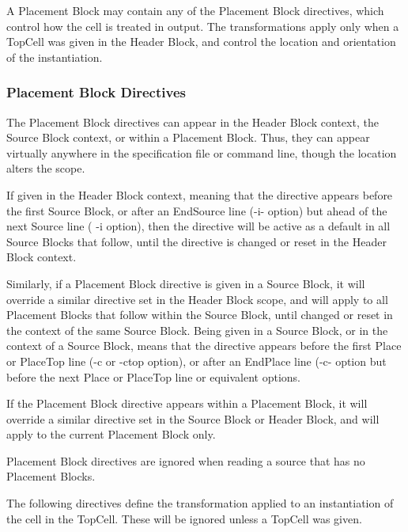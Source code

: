 A Placement Block may contain any of the Placement Block directives,
which control how the cell is treated in output.  The transformations
apply only when a {\vt TopCell} was given in the Header Block, and
control the location and orientation of the instantiation.

\subsubsection{Placement Block Directives}

The Placement Block directives can appear in the Header Block context,
the Source Block context, or within a Placement Block.  Thus, they can
appear virtually anywhere in the specification file or command line,
though the location alters the scope.

If given in the Header Block context, meaning that the directive
appears before the first Source Block, or after an {\vt EndSource}
line ({\vt -i-} option) but ahead of the next {\vt Source} line ({\vt
-i} option), then the directive will be active as a default in all
Source Blocks that follow, until the directive is changed or reset in
the Header Block context.

Similarly, if a Placement Block directive is given in a Source Block,
it will override a similar directive set in the Header Block scope,
and will apply to all Placement Blocks that follow within the Source
Block, until changed or reset in the context of the same Source Block. 
Being given in a Source Block, or in the context of a Source Block,
means that the directive appears before the first {\vt Place} or {\vt
PlaceTop} line ({\vt -c} or {\vt -ctop} option), or after an {\vt
EndPlace} line ({\vt -c-} option but before the next {\vt Place} or
{\vt PlaceTop} line or equivalent options.

If the Placement Block directive appears within a Placement Block, it
will override a similar directive set in the Source Block or Header
Block, and will apply to the current Placement Block only.

Placement Block directives are ignored when reading a source that has
no Placement Blocks.

The following directives define the transformation applied to an
instantiation of the cell in the {\vt TopCell}.  These will be ignored
unless a {\vt TopCell} was given.

